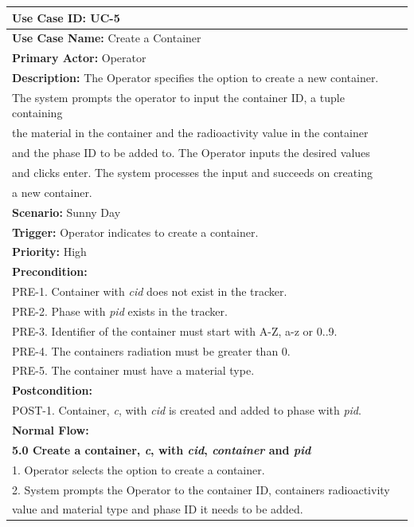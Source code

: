 \begin{table}[h]
\begin{center}
\begin{tabular}{|l|l|}
\hline
\textbf{Use Case ID:} UC-5 \\ \hline
\textbf{Use Case Name:} Create a Container \\ \hline
\textbf {Primary Actor:} Operator \\ \hline
\textbf{Description:} The Operator specifies the option to create a new container. \\The system prompts the operator to input the container ID, a tuple containing \\the material in the container and the radioactivity value in the container \\and the phase ID to be added to. The Operator inputs the desired values \\and clicks enter. The system processes the input and succeeds on creating \\a new container. \\ \hline
\textbf{Scenario:} Sunny Day \\ \hline
\textbf{Trigger:} Operator indicates to create a container.\\ \hline
\textbf{Priority:} High \\ \hline
\textbf{Precondition:}
\\ PRE-1. Container with \emph{cid} does not exist in the tracker.
\\ PRE-2. Phase with \emph{pid} exists in the tracker.
\\ PRE-3. Identifier of the container must start with A-Z, a-z or 0..9.
\\ PRE-4. The containers radiation must be greater than 0.
\\ PRE-5. The container must have a material type. \\ \hline
\textbf{Postcondition:}
\\ POST-1. Container, \emph{c}, with \emph{cid} is created and added to phase with \emph{pid}. \\ \hline
\textbf{Normal Flow:} 
\\ \textbf{5.0 Create a container, \emph{c}, with \emph{cid}, \emph{container} and \emph{pid}}
\\ 1. Operator selects the option to create a container.
\\ 2. System prompts the Operator to the container ID, containers radioactivity \\value and material type and phase ID it needs to be added.

\end{tabular}
\end{center}
\end{table}
